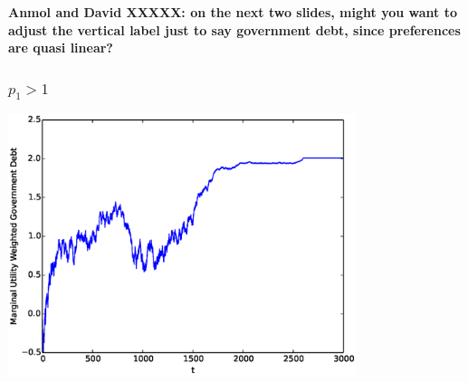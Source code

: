 \documentclass{beamer}
\begin{document}
\begin{frame}

\textbf{Anmol and David XXXXX: on the next two slides, might you want to adjust the vertical label just to say government debt, since preferences
are quasi linear?}

\end{frame}


 \begin{frame}

	\frametitle{$p_1 > 1$}
	\begin{center}
	\includegraphics[width=4in]{Images/port1.eps}
	\end{center}
\end{frame}
\end{document}
